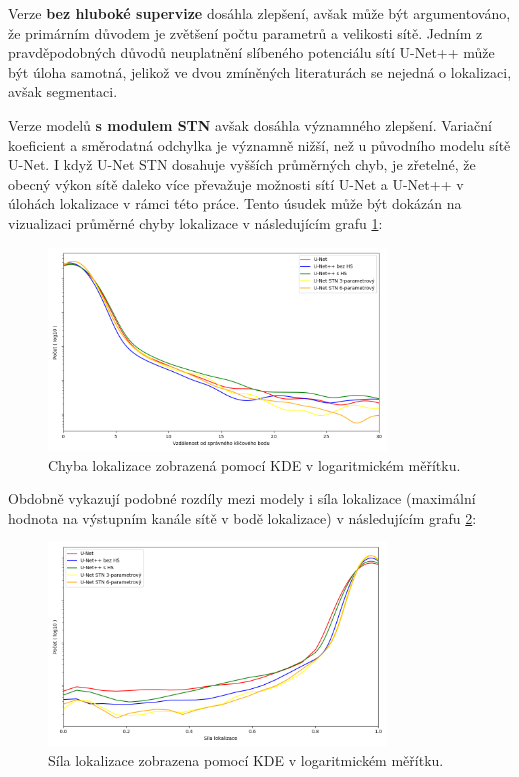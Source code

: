 Verze \textbf{bez hluboké supervize} dosáhla zlepšení, avšak může být argumentováno, že primárním důvodem je zvětšení počtu parametrů a velikosti sítě. Jedním z pravděpodobných důvodů neuplatnění slíbeného potenciálu sítí U-Net++ může být úloha samotná, jelikož ve dvou zmíněných literaturách se nejedná o lokalizaci, avšak segmentaci.

Verze modelů \textbf{s modulem STN} avšak dosáhla významného zlepšení. Variační koeficient a směrodatná odchylka je významně nižší, než u původního modelu sítě U-Net. I když U-Net STN dosahuje vyšších průměrných chyb, je zřetelné, že obecný výkon sítě daleko více převažuje možnosti sítí U-Net a U-Net++ v úlohách lokalizace v rámci této práce. Tento úsudek může být dokázán na vizualizaci průměrné chyby lokalizace v následujícím grafu \ref{fig:loc_distance}:
\pagebreak
\begin{figure}[ht]
\centering
\includegraphics[width=0.8\textwidth,keepaspectratio]{Figures/plots/loc_distance.png}
\caption[Chyba lokalizace modelů]{Chyba lokalizace zobrazená pomocí KDE v logaritmickém měřítku. }
\label{fig:loc_distance}
\end{figure}

Obdobně vykazují podobné rozdíly mezi modely i síla lokalizace (maximální hodnota na výstupním kanále sítě v bodě lokalizace) v následujícím grafu \ref{fig:loc_strength}:

\begin{figure}[H]
\centering
\includegraphics[width=0.8\textwidth,keepaspectratio]{Figures/plots/loc_strength.png}
\caption[Síla lokalizace modelů]{Síla lokalizace zobrazena pomocí KDE v logaritmickém měřítku. }
\label{fig:loc_strength}
\end{figure}

